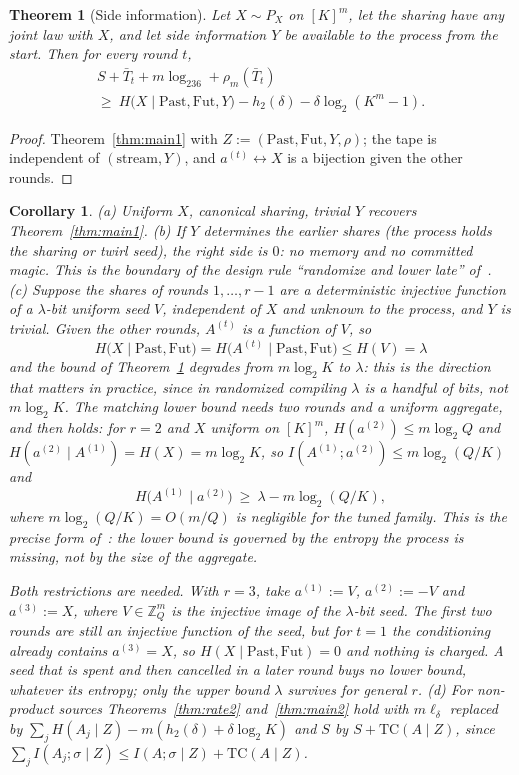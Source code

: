 \documentclass[aps,prx,twocolumn,superscriptaddress,nofootinbib,longbibliography]{revtex4-2}
\theoremstyle{plain}
\newtheorem{theorem}{Theorem}
\newtheorem{corollary}{Corollary}
\theoremstyle{definition}
\theoremstyle{remark}
\newcommand{\Z}{\mathbb{Z}}
\begin{document}
\begin{theorem}[Side information]\label{thm:side}
Let $X\sim P_X$ on $[K]^m$, let the sharing have any joint law with $X$, and let side information $Y$ be available to the process from the start. Then for every round $t$,
\begin{multline}
S+\bar T_t+m\log_236+\rho_m(\bar T_t)\\
\ge\ H\big(X\mid\mathrm{Past},\mathrm{Fut},Y\big)-h_2(\delta)-\delta\log_2(K^m-1).
\end{multline}
\end{theorem}
\begin{proof}
Theorem~\ref{thm:main1} with $Z:=(\mathrm{Past},\mathrm{Fut},Y,\rho)$; the tape is independent of $(\text{stream},Y)$, and $a^{(t)}\leftrightarrow X$ is a bijection given the other rounds.
\end{proof}
\begin{corollary}\label{cor:side}
(a) Uniform $X$, canonical sharing, trivial $Y$ recovers Theorem~\ref{thm:main1}.
(b) If $Y$ determines the earlier shares (the process holds the sharing or twirl seed), the right side is $0$: no memory and no committed magic. This is the boundary of the design rule ``randomize and lower late'' of~\cite{Paper1}.
(c) Suppose the shares of rounds $1,\dots,r-1$ are a deterministic injective function of a $\lambda$-bit uniform seed $V$, independent of $X$ and unknown to the process, and $Y$ is trivial. Given the other rounds, $A^{(t)}$ is a function of $V$, so
\[H\big(X\mid\mathrm{Past},\mathrm{Fut}\big)=H\big(A^{(t)}\mid\mathrm{Past},\mathrm{Fut}\big)\le H(V)=\lambda\]
and the bound of Theorem~\ref{thm:side} degrades from $m\log_2K$ to $\lambda$: this is the direction that matters in practice, since in randomized compiling $\lambda$ is a handful of bits, not $m\log_2K$. The matching lower bound needs two rounds and a uniform aggregate, and then holds: for $r=2$ and $X$ uniform on $[K]^m$, $H(a^{(2)})\le m\log_2Q$ and $H(a^{(2)}\mid A^{(1)})=H(X)=m\log_2K$, so $I(A^{(1)};a^{(2)})\le m\log_2(Q/K)$ and
\[H\big(A^{(1)}\mid a^{(2)}\big)\ \ge\ \lambda-m\log_2(Q/K),\]
where $m\log_2(Q/K)=O(m/Q)$ is negligible for the tuned family. This is the precise form of~\cite[Rem.~9]{Paper1}: the lower bound is governed by the entropy the process is missing, not by the size of the aggregate.

Both restrictions are needed. With $r=3$, take $a^{(1)}:=V$, $a^{(2)}:=-V$ and $a^{(3)}:=X$, where $V\in\Z_Q^m$ is the injective image of the $\lambda$-bit seed. The first two rounds are still an injective function of the seed, but for $t=1$ the conditioning already contains $a^{(3)}=X$, so $H(X\mid\mathrm{Past},\mathrm{Fut})=0$ and nothing is charged. A seed that is spent and then cancelled in a later round buys no lower bound, whatever its entropy; only the upper bound $\lambda$ survives for general $r$.
(d) For non-product sources Theorems~\ref{thm:rate2} and~\ref{thm:main2} hold with $m\ell_\delta$ replaced by $\sum_jH(A_j\mid Z)-m(h_2(\delta)+\delta\log_2K)$ and $S$ by $S+\mathrm{TC}(A\mid Z)$, since $\sum_jI(A_j;\sigma\mid Z)\le I(A;\sigma\mid Z)+\mathrm{TC}(A\mid Z)$.
\end{corollary}
\end{document}

